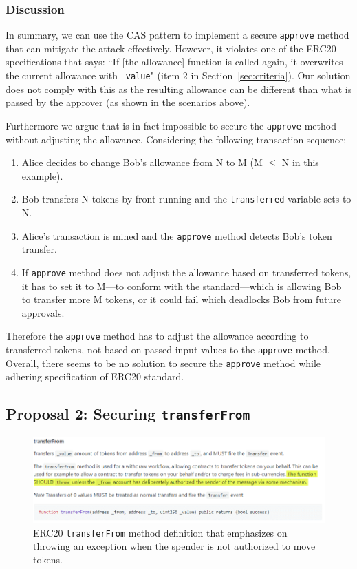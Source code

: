 \subsubsection*{Discussion} In summary, we can use the CAS pattern to implement a secure \texttt{approve} method that can mitigate the attack effectively. However, it violates one of the ERC20 specifications that says: ``If [the allowance] function is called again, it overwrites the current allowance with \texttt{\_value}" (item 2 in Section~\ref{sec:criteria}). Our solution does not comply with this as the resulting allowance can be different than what is passed by the approver (as shown in the scenarios above).

Furthermore we argue that is in fact impossible to secure the \texttt{approve} method without adjusting the allowance. Considering the following transaction sequence:

\begin{enumerate}
	\item Alice decides to change Bob's allowance from N to M (M $\leq$ N in this example).
	\item Bob transfers N tokens by front-running and the \texttt{transferred} variable sets to N.
	\item Alice's transaction is mined and the \texttt{approve} method detects Bob's token transfer.
	\item If \texttt{approve} method does not adjust the allowance based on transferred tokens, it has to set it to M---to conform with the standard---which is allowing Bob to transfer more M tokens, or it could fail which deadlocks Bob from future approvals.
\end{enumerate}

Therefore the \texttt{approve} method has to adjust the allowance according to transferred tokens, not based on passed input values to the \texttt{approve} method. Overall, there seems to be no solution to secure the \texttt{approve} method while adhering specification of ERC20 standard.



\subsection{Proposal 2: Securing \texttt{transferFrom}}\label{sec:proposal2}

\begin{figure}[t]
	\centering
	\includegraphics[width=1.0\linewidth]{figures/multiple_withdrawal_30.png}
	\caption{ERC20 \texttt{transferFrom} method definition that emphasizes on throwing an exception when the spender is not authorized to move tokens.\label{fig:standard}}
\end{figure}

